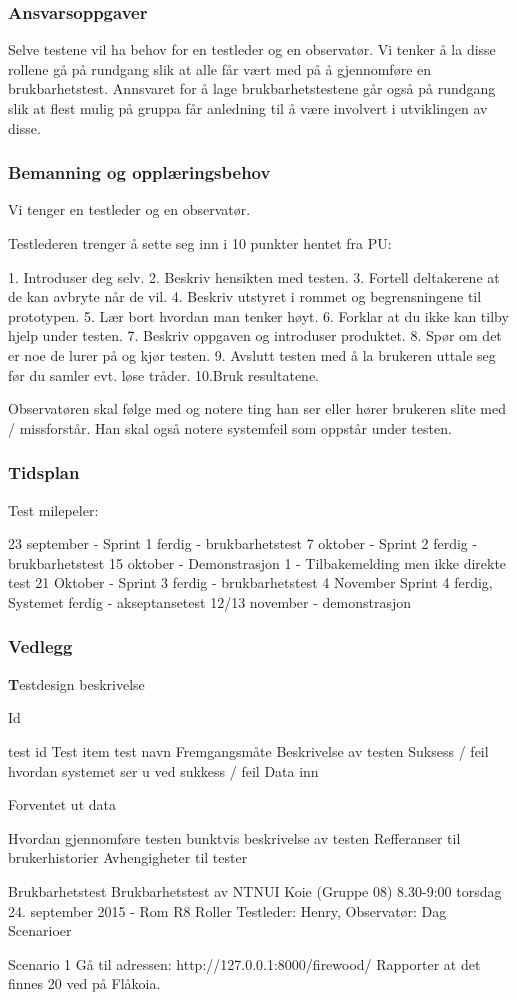 \subsubsection{Ansvarsoppgaver}
Selve testene vil ha behov for en testleder og en observatør. Vi tenker å la disse rollene gå på rundgang slik at alle får vært med på å gjennomføre en brukbarhetstest. Annsvaret for å lage brukbarhetstestene går også på rundgang slik at flest mulig på gruppa får anledning til å være involvert i utviklingen av disse.

\subsubsection{Bemanning og opplæringsbehov}
Vi tenger en testleder og en observatør. 

Testlederen trenger å sette seg inn i 10 punkter hentet fra PU:

1. Introduser deg selv. 
2. Beskriv hensikten med testen. 
3. Fortell deltakerene at de kan avbryte når de vil.
4. Beskriv utstyret i rommet og begrensningene til prototypen. 
5. Lær bort hvordan man tenker høyt. 
6. Forklar at du ikke kan tilby hjelp under testen. 
7. Beskriv oppgaven og introduser produktet. 
8. Spør om det er noe de lurer på og kjør testen. 
9. Avslutt testen med å la brukeren uttale seg før du samler evt. løse tråder. 
10.Bruk resultatene. 

Observatøren skal følge med og notere ting han ser eller hører brukeren slite med / missforstår. Han skal også notere systemfeil som oppstår under testen.

\subsubsection{Tidsplan}
Test milepeler:

23 september - Sprint 1 ferdig - brukbarhetstest
7 oktober - Sprint 2 ferdig - brukbarhetstest
15 oktober - Demonstrasjon 1 - Tilbakemelding men ikke direkte test
21 Oktober - Sprint 3 ferdig - brukbarhetstest
4 November Sprint 4 ferdig, Systemet ferdig - akseptansetest
12/13 november - demonstrasjon 

\subsubsection{Vedlegg}
\bigskip \noindent \textbf Testdesign beskrivelse

Id

test id
Test item
test navn
Fremgangsmåte
Beskrivelse av testen
Suksess / feil 
hvordan systemet ser u ved sukkess / feil
Data inn


Forventet ut data


Hvordan gjennomføre testen
bunktvis beskrivelse av testen
Refferanser
til brukerhistorier
Avhengigheter
til tester



Brukbarhetstest
Brukbarhetstest av NTNUI Koie (Gruppe 08)
	8.30-9:00 torsdag 24. september 2015 - Rom R8
Roller
	Testleder: Henry, Observatør: Dag
Scenarioer

Scenario 1
Gå til adressen: http://127.0.0.1:8000/firewood/
Rapporter at det finnes 20 ved på Flåkoia.
